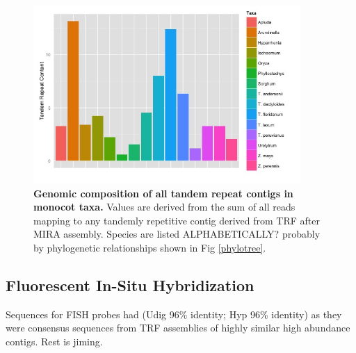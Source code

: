\documentclass[10pt,letterpaper]{article}
\begin{document}
\begin{figure}[h]
\begin{center}
\includegraphics[width=4in]{totaltrfcontent.png}
\end{center}
\caption{{\bf Genomic composition of all tandem repeat contigs in monocot taxa.}
Values are derived from the sum of all reads mapping to any tandemly repetitive contig derived from TRF after MIRA assembly.  
Species are listed ALPHABETICALLY? probably by phylogenetic relationships shown in Fig \ref{phylotree}.}
\label{totaltrf}
\end{figure}


\subsection*{Fluorescent In-Situ Hybridization}
Sequences for FISH probes had (Udig 96\% identity; Hyp 96\% identity) as they were consensus sequences from TRF assemblies of highly similar high abundance contigs.
Rest is jiming.

%

\end{document}
